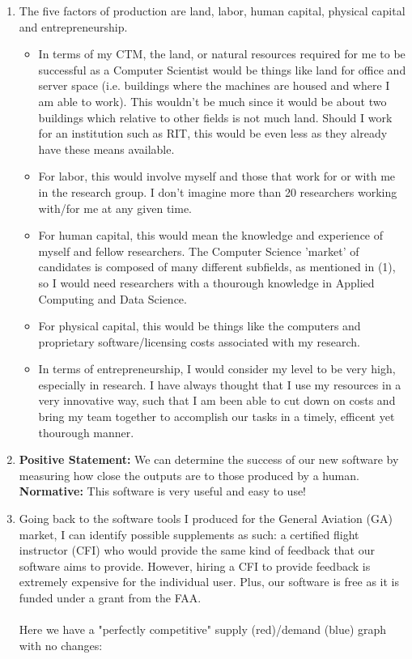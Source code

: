 \documentclass[12pt]{article}
\begin{document}
\begin{enumerate}
\item
    The five factors of production are land, labor, human capital, physical capital and entrepreneurship.
    \begin{itemize}
        \item In terms of my CTM, the land, or natural resources required for me to be successful as a Computer Scientist would be things like land for office and server space (i.e. buildings where the machines are housed and where I am able to work). This wouldn't be much since it would be about two buildings which relative to other fields is not much land. Should I work for an institution such as RIT, this would be even less as they already have these means available.
        \item For labor, this would involve myself and those that work for or with me in the research group. I don't imagine more than 20 researchers working with/for me at any given time.
        \item For human capital, this would mean the knowledge and experience of myself and fellow researchers. The Computer Science 'market' of candidates is composed of many different subfields, as mentioned in (1), so I would need researchers with a thourough knowledge in Applied Computing and Data Science.
        \item For physical capital, this would be things like the computers and proprietary software/licensing costs associated with my research.  
        \item In terms of entrepreneurship, I would consider my level to be very high, especially in research. I have always thought that I use my resources in a very innovative way, such that I am been able to cut down on costs and bring my team together to accomplish our tasks in a timely, efficent yet thourough manner.
    \end{itemize}

\item
    \textbf{Positive Statement:} We can determine the success of our new software by measuring how close the outputs are to those produced by a human. \\
    \textbf{Normative:} This software is very useful and easy to use!

\item
    Going back to the software tools I produced for the General Aviation (GA) market, I can identify possible supplements as such: a certified flight instructor (CFI) who would provide the same kind of feedback that our software aims to provide. However, hiring a CFI to provide feedback is extremely expensive for the individual user. Plus, our software is free as it is funded under a grant from the FAA.  \\
\hfill \\
Here we have a "perfectly competitive" supply (red)/demand (blue) graph with no changes:


\end{enumerate}
\end{document}
